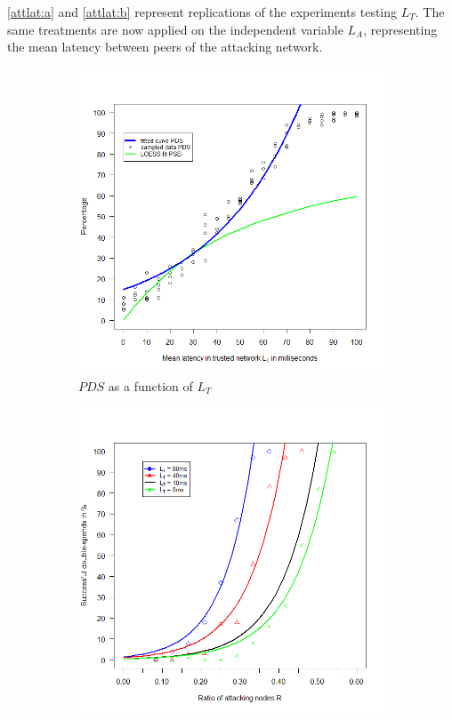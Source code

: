 \documentclass[a4paper,12pt,twoside]{report}
\begin{document}
\autoref{attlat:a} and \autoref{attlat:b} represent replications of the experiments testing $L_T$. The same treatments are now applied on the independent variable $L_A$, representing the mean latency between peers of the attacking network.\begin{figure}
\centering
\begin{subfigure}{.5\textwidth}
  \centering
  \includegraphics[width=\linewidth]{Experiments/TruLatency/trulat.png}
  \caption{$PDS$ as a function of $L_{T}$}
  \label{trulat:a}
\end{subfigure}%
\begin{subfigure}{.5\textwidth}
  \centering
  \includegraphics[width=\linewidth]{Experiments/TruLatency/trurat.png}

\end{subfigure}
\end{figure}
\end{document}

